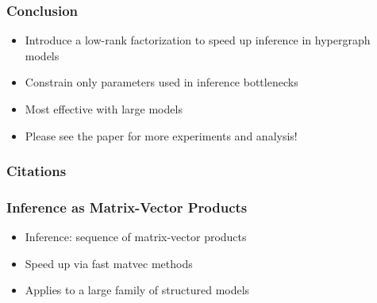 \documentclass{beamer}
\begin{document}
\begin{frame}
\frametitle{Conclusion}
\begin{itemize}
\item Introduce a low-rank factorization to speed up inference in hypergraph models
\vspace{2em}
\item Constrain only parameters used in inference bottlenecks
\vspace{2em}
\item Most effective with large models
\vspace{2em}
\item Please see the paper for more experiments and analysis!
\end{itemize}
\end{frame}


\begin{frame}[allowframebreaks]
\frametitle{Citations}
\printbibliography
\end{frame}






\begin{frame}
\frametitle{Inference as Matrix-Vector Products}
\begin{itemize}
\item Inference: sequence of matrix-vector products
\vspace{1em}
\item Speed up via fast matvec methods 
\vspace{1em}
\item Applies to a large family of structured models
\end{itemize}
\end{frame}

\end{document}
